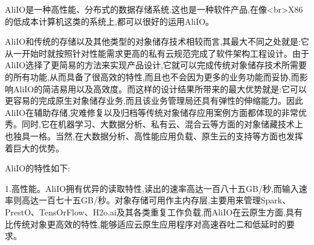 







AliIO是一种高性能、分布式的数据存储系统.这也是一种软件产品,在像<br>X86的低成本计算机这类的系统上,都可以很好的运用AliIO。

AliIO和传统的存储以及其他类型的对象储存技术相较而言,其最大不同之处就是:它从一开始时就按照针对性能需求更高的私有云规范完成了软件架构工程设计。由于AliIO选择了更简易的方法来实现产品设计,它就可以完成传统对象储存技术所需要的所有功能,从而具备了很高效的特性,而且也不会因为更多的业务功能而妥协,而影响AliIO的简洁易用以及高效度。而这样的设计结果所带来的最大优势就是:它可以更容易的完成原生对象储存业务,而且该业务管理局还具有弹性的伸缩能力。因此AliIO在辅助存储,灾难修复以及归档等传统对象储存应用案例方面都体现的非常优秀。同时,它在机器学习、大数据分析、私有云、混合云等方面的对象储藏技术上也独具一格。当然,在大数据分析、高性能应用负载、原生云的支持等方面也发挥着巨大的优势。

AliIO的特性如下:

1.高性能。AliIO拥有优异的读取特性,读出的速率高达一百八十五GB/秒,而输入速率则高达一百七十五GB/秒。对象存储可用作主内存层,主要用来管理Spark、PrestO、TensOrFlow、H2o.ai及其各类重复工作负载,而AliIO在云原生方面,具有比传统对象更高效的特性,能够适应云原生应用程序对高速吞吐二和低延时的要求。

